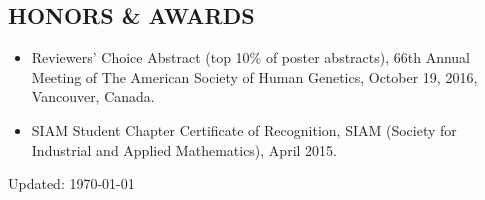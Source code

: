 \documentclass[overlapped, line, 10pt]{res} %
\begin{document}
\begin{resume}

\section{HONORS \& AWARDS}

\begin{itemize}
  \item Reviewers’ Choice Abstract (top 10\% of poster abstracts), 66th Annual Meeting of The American Society of Human Genetics, October 19, 2016, Vancouver, Canada.
  \item SIAM Student Chapter Certificate of Recognition, SIAM (Society for Industrial and Applied Mathematics), April 2015.
\end{itemize}

\vfill
\centerline{Updated: \today}


\end{resume}
\end{document}
